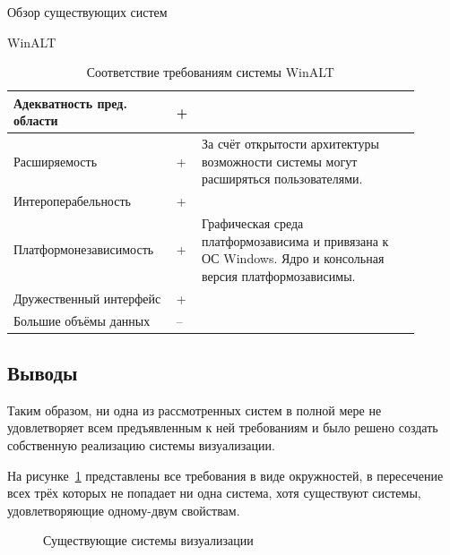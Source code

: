 \documentclass[a4paper,12pt]{extarticle}
\begin{document}
\begin{section}{Обзор существующих систем}
\begin{subsection}{WinALT}
    \begin{table}[h]
        \caption{Соответствие требованиям системы WinALT}
        \label{tabular:winalt}
        \begin{center}
            \begin{tabular}{|p{0.35\linewidth}|p{0.05\linewidth}|p{0.5\linewidth}|} \hline
                Адекватность пред. области & + & \\ \hline
                Расширяемость              & + & За счёт открытости архитектуры возможности системы могут расширяться пользователями.\\ \hline
                Интероперабельность        & + & \\ \hline
                Платформонезависимость     & + & Графическая среда платформозависима и привязана к ОС Windows. Ядро и консольная версия платформозависимы. \\ \hline
                Дружественный интерфейс    & + & \\ \hline
                Большие объёмы данных      & -- & \\ \hline            
            \end{tabular}
        \end{center}
    \end{table}
\end{subsection}


\subsection{Выводы}

Таким образом, ни одна из рассмотренных систем в полной мере не удовлетворяет всем предъявленным к ней требованиям и было решено создать собственную реализацию системы визуализации. 

На рисунке~\ref{ris:systems-simulus} представлены все требования в виде окружностей, в пересечение всех трёх которых не попадает ни одна система, хотя существуют системы, удовлетворяющие одному-двум свойствам.

\begin{figure}[h]
    \caption{Существующие системы визуализации}
    \label{ris:systems-simulus}
\end{figure}

\end{section}
\end{document}
